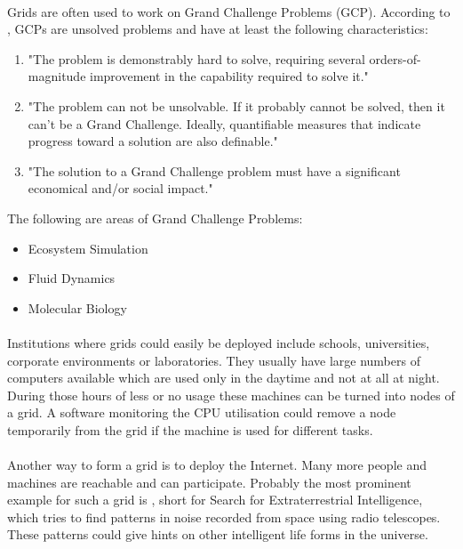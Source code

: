 \paragraph{}
Grids are often used to work on Grand Challenge Problems (GCP). According to , GCPs are unsolved problems and have at least the following characteristics:
\begin{enumerate}
\item "The problem is demonstrably hard to solve, requiring several orders-of-magnitude improvement in the capability required to solve it."
\item "The problem can not be unsolvable. If it probably cannot be solved, then it can't be a Grand Challenge. Ideally, quantifiable measures that indicate progress toward a solution are also definable."
\item "The solution to a Grand Challenge problem must have a significant economical and/or social impact."
\end{enumerate}
The following are areas of Grand Challenge Problems:
\begin{itemize}
\item Ecosystem Simulation
\item Fluid Dynamics
\item Molecular Biology
\end{itemize}

\paragraph{}
Institutions where grids could easily be deployed include schools, universities, corporate environments or laboratories. They usually have large numbers of computers available which are used only in the daytime and not at all at night. During those hours of less or no usage these machines can be turned into nodes of a grid. A software monitoring the CPU utilisation could remove a node temporarily from the grid if the machine is used for different tasks.

\paragraph{}
Another way to form a grid is to deploy the Internet. Many more people and machines are reachable and can participate. Probably the most prominent example for such a grid is , short for Search for Extraterrestrial Intelligence, which tries to find patterns in noise recorded from space using radio telescopes. These patterns could give hints on other intelligent life forms in the universe.


